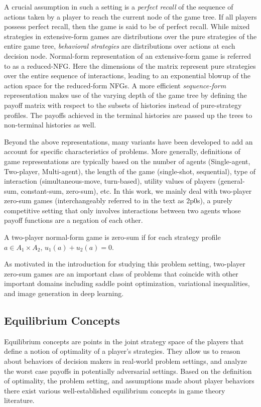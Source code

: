 A crucial assumption in such a setting is a \textit{perfect recall} of the sequence of actions
taken by a player to reach the current node of the game tree.
If all players possess perfect recall, then the game is said to be of perfect recall.
While mixed strategies in extensive-form games are distributions over the pure strategies of the
entire game tree, \textit{behavioral strategies} are distributions over actions at each decision
node.
Normal-form representation of an extensive-form game is referred to as a reduced-NFG.
Here the dimensions of the matrix represent pure strategies over the entire sequence of
interactions, leading to an exponential blowup of the action space for the reduced-form NFGs.
A more efficient \textit{sequence-form} representation makes use of the varying depth of the game
tree by defining the payoff matrix with respect to the subsets of histories instead of
pure-strategy profiles.
The payoffs achieved in the terminal histories are passed up the trees to non-terminal histories as
well.

Beyond the above representations, many variants have been developed to add an account for specific
characteristics of problems.
More generally, definitions of game representations are typically based on the number of agents
(Single-agent, Two-player, Multi-agent), the length of the game (single-shot, sequential), type of
interaction (simultaneous-move, turn-based), utility values of players (general-sum, constant-sum,
zero-sum), etc. In this work, we mainly deal with two-player zero-sum games (interchangeably
referred to in the text as 2p0s), a purely competitive setting that only involves interactions
between two agents whose payoff functions are a negation of each other.
\begin{definition}
	A two-player normal-form game is zero-sum if for each strategy profile $a \in A_1 \times A_2$,
	$u_1(a) + u_2(a) = 0$.
\end{definition}
As motivated in the introduction for studying this problem setting, two-player zero-sum games are
an important class of problems that coincide with other important domains including saddle point
optimization, variational inequalities, and image generation in deep learning.

\subsection{Equilibrium Concepts}
Equilibrium concepts are points in the joint strategy space of the players that define a notion of
optimality of a player's strategies.
They allow us to reason about behaviors of decision makers in real-world problem settings, and
analyze the worst case payoffs in potentially adversarial settings.
Based on the definition of optimality, the problem setting, and assumptions made about player
behaviors there exist various well-established equilibrium concepts in game theory literature.

